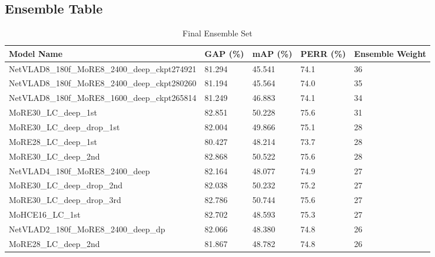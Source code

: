 \documentclass[10pt,twocolumn,letterpaper]{article}
\begin{document}
\begin{appendices}



\section{Ensemble Table}



\begin{table*}[t]
\centering
\caption{Final Ensemble Set}
\label{table:ensemble}
\begin{tabular}{lP{1.5cm}P{1.5cm}P{1.5cm}P{2.5cm}}
Model Name                             & GAP (\%)   & mAP (\%) & PERR (\%) & Ensemble Weight \\ \hline \hline
NetVLAD8\_180f\_MoRE8\_2400\_deep\_ckpt274921   &  81.294  &  45.541  &  74.1  &  36  \\
NetVLAD8\_180f\_MoRE8\_2400\_deep\_ckpt280260   &  81.194  &  45.564  &  74.0  &  35 \\  
NetVLAD8\_180f\_MoRE8\_1600\_deep\_ckpt265814   &  81.249  &  46.883  &  74.1  &  34 \\
MoRE30\_LC\_deep\_1st                            &  82.851  &  50.228  &  75.6  &  31 \\
MoRE30\_LC\_deep\_drop\_1st                      &  82.004  &  49.866  &  75.1  &  28 \\
MoRE28\_LC\_deep\_1st                            &  80.427  &  48.214  &  73.7  &  28 \\
MoRE30\_LC\_deep\_2nd                            &  82.868  &  50.522  &  75.6  &  28 \\
NetVLAD4\_180f\_MoRE8\_2400\_deep               &  82.164  &  48.077  &  74.9  &  27 \\
MoRE30\_LC\_deep\_drop\_2nd                      &  82.038  &  50.232  &  75.2  &  27 \\
MoRE30\_LC\_deep\_drop\_3rd                      &  82.786  &  50.744  &  75.6  &  27 \\
MoHCE16\_LC\_1st                                 &  82.702  &  48.593  &  75.3  &  27 \\
NetVLAD2\_180f\_MoRE8\_2400\_deep\_dp           &  82.066  &  48.380  &  74.8  &  26 \\
MoRE28\_LC\_deep\_2nd                            &  81.867  &  48.782  &  74.8  &  26 \\

\end{tabular}
\end{table*}
\end{appendices}
\end{document}
